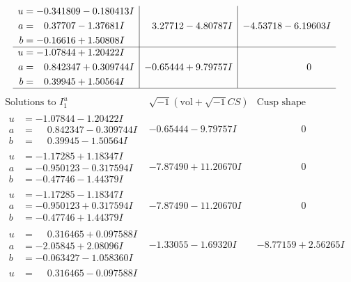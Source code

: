 \documentclass[1p]{elsarticle_modified}
\theoremstyle{definition}
\newcommand{\I}{\sqrt{-1}}
\begin{document}
$$\begin{array}{c|c|c}
\begin{aligned}
u &= -0.341809 - 0.180413 I \\
a &= \phantom{-}0.37707 - 1.37681 I \\
b &= -0.16616 + 1.50808 I\end{aligned}
 & \phantom{-}3.27712 - 4.80787 I & -4.53718 - 6.19603 I \\ \hline\begin{aligned}
u &= -1.07844 + 1.20422 I \\
a &= \phantom{-}0.842347 + 0.309744 I \\
b &= \phantom{-}0.39945 + 1.50564 I\end{aligned}
 & -0.65444 + 9.79757 I & \phantom{-0.000000 } 0\\
 \hline 
 \end{array}$$\newpage$$\begin{array}{c|c|c}  
\text{Solutions to }I^u_{1}& \I (\text{vol} + \sqrt{-1}CS) & \text{Cusp shape}\\
 \hline 
\begin{aligned}
u &= -1.07844 - 1.20422 I \\
a &= \phantom{-}0.842347 - 0.309744 I \\
b &= \phantom{-}0.39945 - 1.50564 I\end{aligned}
 & -0.65444 - 9.79757 I & \phantom{-0.000000 } 0 \\ \hline\begin{aligned}
u &= -1.17285 + 1.18347 I \\
a &= -0.950123 - 0.317594 I \\
b &= -0.47746 - 1.44379 I\end{aligned}
 & -7.87490 + 11.20670 I & \phantom{-0.000000 } 0 \\ \hline\begin{aligned}
u &= -1.17285 - 1.18347 I \\
a &= -0.950123 + 0.317594 I \\
b &= -0.47746 + 1.44379 I\end{aligned}
 & -7.87490 - 11.20670 I & \phantom{-0.000000 } 0 \\ \hline\begin{aligned}
u &= \phantom{-}0.316465 + 0.097588 I \\
a &= -2.05845 + 2.08096 I \\
b &= -0.063427 - 1.058360 I\end{aligned}
 & -1.33055 - 1.69320 I & -8.77159 + 2.56265 I \\ \hline\begin{aligned}
u &= \phantom{-}0.316465 - 0.097588 I \\

\end{aligned}
\end{array}$$
\end{document}
